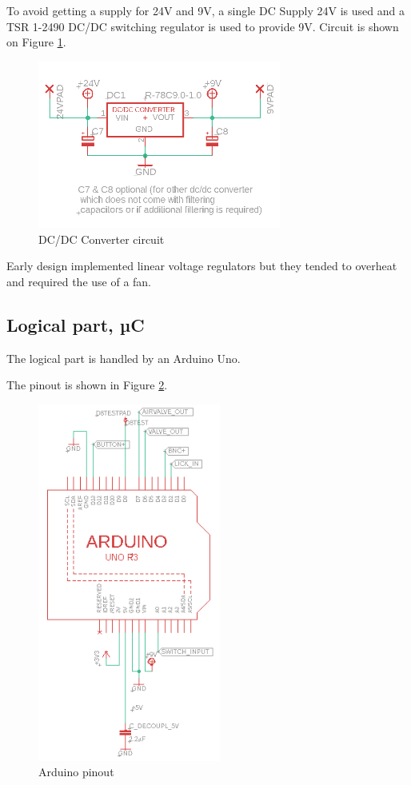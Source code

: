 \documentclass[a4paper]{article}
\begin{document}
To avoid getting a supply for 24V and 9V, a single DC Supply 24V is used and a TSR 1-2490 DC/DC switching regulator is used to provide 9V.
Circuit is shown on Figure \ref{fig:dcdc}.

\begin{figure}[h!]
    \centering
        \includegraphics[width = 8cm]{images/dcdcconverter.PNG}
    \caption{DC/DC Converter circuit}
    \label{fig:dcdc}
\end{figure}

Early design implemented linear voltage regulators but they tended to overheat and required the use of a fan.


\subsection{Logical part, µC}
The logical part is handled by an Arduino Uno.

The pinout is shown in Figure \ref{fig:logical}.

\begin{figure}[h!]
    \centering
    \includegraphics[width = 6cm]{images/logical.PNG}
    \caption{Arduino pinout}
    \label{fig:logical}
\end{figure}
\end{document}
